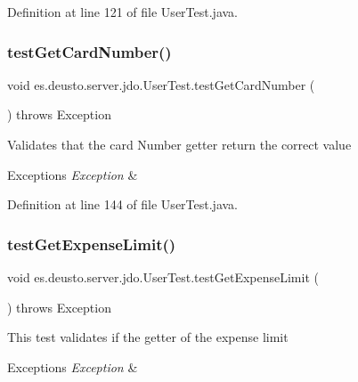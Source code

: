 Definition at line 121 of file User\+Test.\+java.

\mbox{\label{classes_1_1deusto_1_1server_1_1jdo_1_1_user_test_ad84d7265ac6d2d4a9e9f3d42e80b8baf}} 
\subsubsection{\texorpdfstring{test\+Get\+Card\+Number()}{testGetCardNumber()}}
{\footnotesize\ttfamily void es.\+deusto.\+server.\+jdo.\+User\+Test.\+test\+Get\+Card\+Number (\begin{DoxyParamCaption}{ }\end{DoxyParamCaption}) throws Exception}

Validates that the card Number getter return the correct value 
\begin{DoxyExceptions}{Exceptions}
{\em Exception} & \\
\hline
\end{DoxyExceptions}


Definition at line 144 of file User\+Test.\+java.

\mbox{\label{classes_1_1deusto_1_1server_1_1jdo_1_1_user_test_ac9953cb0f85111b005a731bc9706a3b5}} 
\subsubsection{\texorpdfstring{test\+Get\+Expense\+Limit()}{testGetExpenseLimit()}}
{\footnotesize\ttfamily void es.\+deusto.\+server.\+jdo.\+User\+Test.\+test\+Get\+Expense\+Limit (\begin{DoxyParamCaption}{ }\end{DoxyParamCaption}) throws Exception}

This test validates if the getter of the expense limit 
\begin{DoxyExceptions}{Exceptions}
{\em Exception} & \\
\hline
\end{DoxyExceptions}



